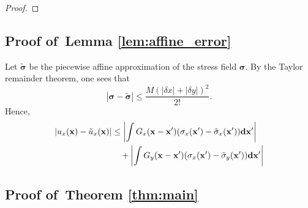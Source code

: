 \documentclass[aps,prl,reprint,twocolumn,groupedaddress,showpacs]{revtex4-1}
\newcommand{\bsigma}{{\boldsymbol\sigma}}
\def\d{{\bf d}}
\def\x{{\bf x}}
\begin{document}
\begin{proof}
\end{proof}
      
\subsection{Proof of~Lemma \ref{lem:affine_error}}

Let $\tilde{\bsigma}$ be the piecewise affine approximation of the stress field $\bsigma$.
By the Taylor remainder theorem, one sees that
$$
|\bsigma - \tilde{\bsigma}| \leq \frac{M (|\delta x| + |\delta y|)^2}{2!}.
$$
Hence,
\begin{align}
|u_x(\x) - \tilde{u}_x(\x)| &\leq \left\vert\int G_x(\x-\x')(\sigma_x(\x') -\tilde\sigma_x(\x') ) \d\x'  \right\vert \nonumber\\
&\quad + \left\vert\int G_y(\x-\x')(\sigma_x(\x') -\tilde\sigma_y(\x') ) \d\x'  \right\vert \nonumber\\
\end{align}

\subsection{Proof of~Theorem \ref{thm:main}}

\end{document}
